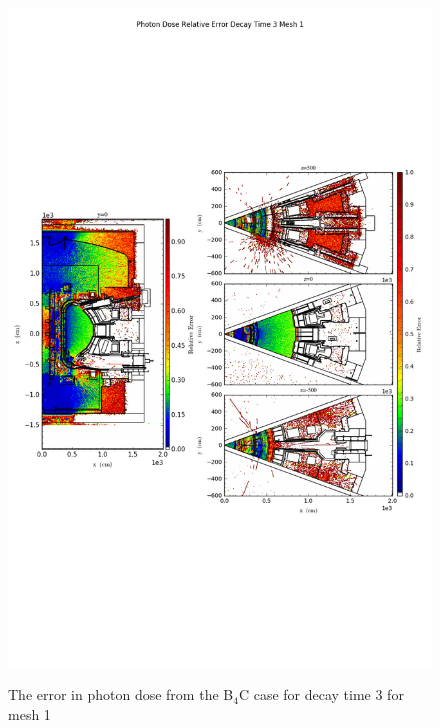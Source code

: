 \begin{figure}[ht!]
\centering
\includegraphics[trim={0cm 9cm 0cm 10cm},clip,scale=0.75]{../plots/final_model_with_b4c/Photon_Dose_Relative_Error_Decay_Time_3_Mesh_1.png}
\label{fig:photons_dc3_no4bc_m1_error}
\caption{The error in photon dose from the B$_4$C case for decay time 3 for mesh 1}
\end{figure}

